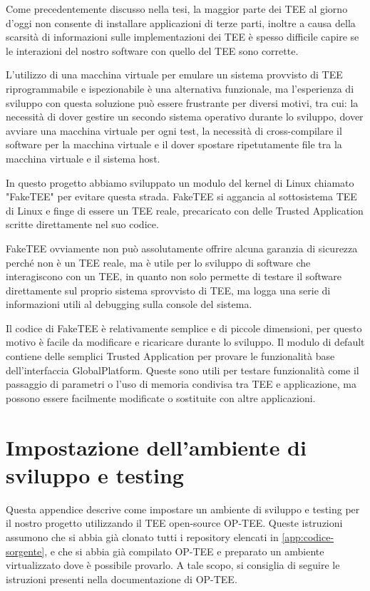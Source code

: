 \documentclass[12pt,italian]{report}
\begin{document}
Come precedentemente discusso nella tesi, la maggior parte dei TEE al giorno
d'oggi non consente di installare applicazioni di terze parti, inoltre
a causa della scarsità di informazioni sulle implementazioni dei TEE
è spesso difficile capire se le interazioni del nostro software con quello
del TEE sono corrette.

L'utilizzo di una macchina virtuale per emulare un sistema provvisto di TEE
riprogrammabile e ispezionabile è una alternativa funzionale, ma
l'esperienza di sviluppo con questa soluzione può essere frustrante per
diversi motivi, tra cui: la necessità di dover gestire un secondo sistema
operativo durante lo sviluppo, dover avviare una macchina virtuale per ogni
test, la necessità di cross-compilare il software per la macchina virtuale
e il dover spostare ripetutamente file tra la macchina virtuale e il sistema
host.

In questo progetto abbiamo sviluppato un modulo del kernel di Linux chiamato
"FakeTEE" per evitare questa strada. FakeTEE si aggancia al sottosistema TEE
di Linux e finge di essere un TEE reale, precaricato con delle
Trusted Application scritte direttamente nel suo codice.

FakeTEE ovviamente non può assolutamente offrire alcuna garanzia di sicurezza
perché non è un TEE reale, ma è utile per lo sviluppo di software che
interagiscono con un TEE, in quanto non solo permette di testare il software
direttamente sul proprio sistema sprovvisto di TEE, ma logga una serie di
informazioni utili al debugging sulla console del sistema.

Il codice di FakeTEE è relativamente semplice e di piccole dimensioni, per
questo motivo è facile da modificare e ricaricare durante lo sviluppo.
Il modulo di default contiene delle semplici Trusted Application per provare
le funzionalità base dell'interfaccia GlobalPlatform.
Queste sono utili per testare funzionalità come il passaggio di parametri o
l'uso di memoria condivisa tra TEE e applicazione, ma possono essere
facilmente modificate o sostituite con altre applicazioni.

\chapter{Impostazione dell'ambiente di sviluppo e testing}
\label{app:impostazione-ambiente-sviluppo-testing}
Questa appendice descrive come impostare un ambiente di sviluppo e testing
per il nostro progetto utilizzando il TEE open-source OP-TEE.
Queste istruzioni assumono che si abbia già clonato tutti i repository
elencati in \ref{app:codice-sorgente}, e che si abbia già compilato OP-TEE e
preparato un ambiente virtualizzato dove è possibile provarlo.
A tale scopo, si consiglia di seguire le istruzioni presenti nella
documentazione di OP-TEE.
\end{document}
